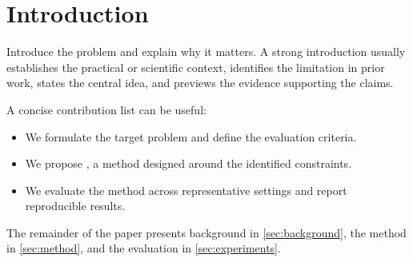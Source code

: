 \section{Introduction}
\label{sec:introduction}

Introduce the problem and explain why it matters. A strong introduction usually establishes the practical or scientific context, identifies the limitation in prior work, states the central idea, and previews the evidence supporting the claims.

A concise contribution list can be useful:
\begin{itemize}[leftmargin=*]
  \item We formulate the target problem and define the evaluation criteria.
  \item We propose \methodname, a method designed around the identified constraints.
  \item We evaluate the method across representative settings and report reproducible results.
\end{itemize}

The remainder of the paper presents background in \cref{sec:background}, the method in \cref{sec:method}, and the evaluation in \cref{sec:experiments}.
